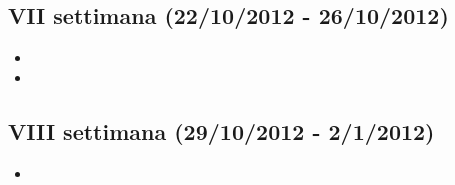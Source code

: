 \documentclass[10pt,a4paper,hidelinks]{scrartcl} %
\begin{document}
	\subsection*{VII settimana (22/10/2012 - 26/10/2012)}
	\begin{itemize}
	\item {}
	\item {}
	\end{itemize}
	\subsection*{VIII settimana (29/10/2012 - 2/1/2012)}
	\begin{itemize}
	\item {}
	\end{itemize}

\end{document}
